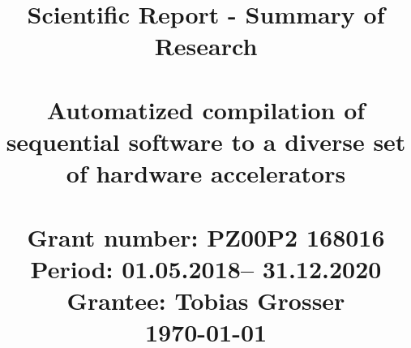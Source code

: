 \documentclass[11pt, manuscript,\review anonymous]{acmart}
\begin{document}
\title[]{
	{
	\centering
	Scientific Report - Summary of Research\\
	~\\
Automatized compilation of sequential software to a diverse set of
hardware accelerators\\
}
~\\
\vspace{18em}
\large
Grant number: PZ00P2 168016\\
Period: 01.05.2018– 31.12.2020\\
Grantee: Tobias Grosser\\
\today
}         %







\ifx\paperversion\paperversioncamera



\renewcommand\footnotetextcopyrightpermission[1]{} %
\fi
\end{document}
